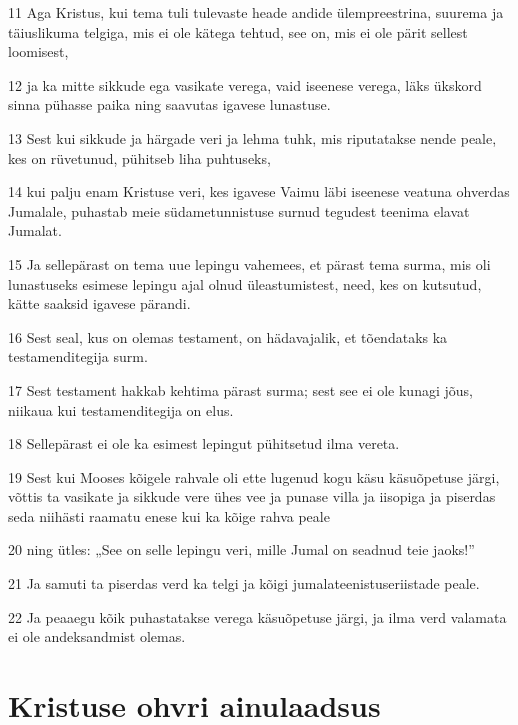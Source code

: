 \par 11 Aga Kristus, kui tema tuli tulevaste heade andide ülempreestrina, suurema ja täiuslikuma telgiga, mis ei ole kätega tehtud, see on, mis ei ole pärit sellest loomisest,
\par 12 ja ka mitte sikkude ega vasikate verega, vaid iseenese verega, läks ükskord sinna pühasse paika ning saavutas igavese lunastuse.
\par 13 Sest kui sikkude ja härgade veri ja lehma tuhk, mis riputatakse nende peale, kes on rüvetunud, pühitseb liha puhtuseks,
\par 14 kui palju enam Kristuse veri, kes igavese Vaimu läbi iseenese veatuna ohverdas Jumalale, puhastab meie südametunnistuse surnud tegudest teenima elavat Jumalat.
\par 15 Ja sellepärast on tema uue lepingu vahemees, et pärast tema surma, mis oli lunastuseks esimese lepingu ajal olnud üleastumistest, need, kes on kutsutud, kätte saaksid igavese pärandi.
\par 16 Sest seal, kus on olemas testament, on hädavajalik, et tõendataks ka testamenditegija surm.
\par 17 Sest testament hakkab kehtima pärast surma; sest see ei ole kunagi jõus, niikaua kui testamenditegija on elus.
\par 18 Sellepärast ei ole ka esimest lepingut pühitsetud ilma vereta.
\par 19 Sest kui Mooses kõigele rahvale oli ette lugenud kogu käsu käsuõpetuse järgi, võttis ta vasikate ja sikkude vere ühes vee ja punase villa ja iisopiga ja piserdas seda niihästi raamatu enese kui ka kõige rahva peale
\par 20 ning ütles: „See on selle lepingu veri, mille Jumal on seadnud teie jaoks!”
\par 21 Ja samuti ta piserdas verd ka telgi ja kõigi jumalateenistuseriistade peale.
\par 22 Ja peaaegu kõik puhastatakse verega käsuõpetuse järgi, ja ilma verd valamata ei ole andeksandmist olemas.

\section*{Kristuse ohvri ainulaadsus}

